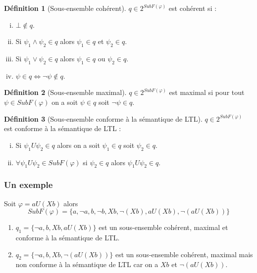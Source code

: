 \documentclass{beamer}
\theoremstyle{plain}
\theoremstyle{definition}
\newtheorem{defi}{Définition}
\begin{document}
\begin{frame}[shrink] 
  \begin{defi}[Sous-ensemble cohérent]
    $q \in 2^{SubF(\varphi)}$ est cohérent si :
    \begin{enumerate}[(i)]
    \item $\bot \not \in q$.
    \item Si $\psi_1 \land \psi_2 \in q$ alors $\psi_1 \in q$ et $\psi_2 \in q$.
    \item Si $\psi_1 \lor \psi_2 \in q$ alors $\psi_1 \in q$ ou $\psi_2 \in q$.
    \item $\psi \in q \iff \lnot \psi \not\in q$.
    \end{enumerate}
  \end{defi}

  \pause
  
  \begin{defi}[Sous-ensemble maximal]
    $q \in 2^{SubF(\varphi)}$ est maximal si pour tout $\psi \in SubF(\varphi)$ on a soit $\psi \in q$ soit $\lnot \psi \in q$.  
  \end{defi}

  \pause
  
  \begin{defi}[Sous-ensemble conforme à la sémantique de LTL]
    \label{ss-ens-ok-ltl}
    $q \in 2^{SubF(\varphi)}$ est conforme à la sémantique de LTL :
    \begin{enumerate}[(i)]
    \item Si $\psi_1 U \psi_2 \in q$ alors on a soit $\psi_1 \in q$ soit $\psi_2 \in q$.
    \item $\forall \psi_1 U \psi_2 \in SubF(\varphi)$ si $\psi_2 \in q$ alors $\psi_1 U \psi_2 \in q$.
    \end{enumerate}
  \end{defi}  
\end{frame}


\begin{frame}
  \frametitle{Un exemple}
  
  Soit $\varphi = a U (Xb)$ alors
  \[
    SubF(\varphi) = \{a, \lnot a, b, \lnot b, Xb, \lnot (Xb), a U (Xb), \lnot (aU(Xb))\}
  \]
  \begin{enumerate}
    \pause
  \item $q_1 = \{\lnot a, b, Xb, a U (Xb)\}$ est un sous-ensemble cohérent, maximal et conforme à la sémantique de LTL.
    \pause
  \item $q_2 = \{\lnot a, b, Xb, \lnot(a U (Xb))\}$ est un sous-ensemble cohérent, maximal mais non conforme à la sémantique de LTL car on a $Xb$ et $\lnot(a U (Xb))$.
  \end{enumerate}
\end{frame}
\end{document}
